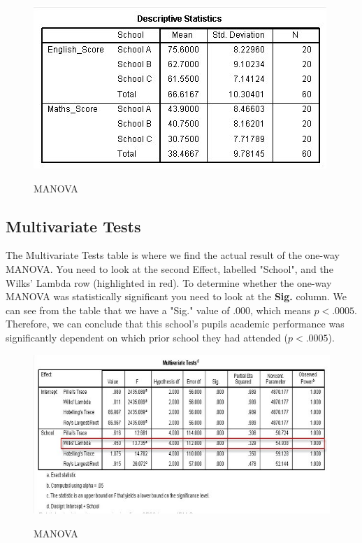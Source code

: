 \documentclass[12pt]{article} %
\begin{document}
\begin{center}
\begin{figure}[h!]
  \includegraphics[scale=0.6]{MANOVA8}\\
  \caption{MANOVA}
\end{figure}
\end{center}


\subsection{Multivariate Tests}
The Multivariate Tests table is where we find the actual result of the one-way MANOVA. You need to look at the second Effect, labelled "School", and the Wilks' Lambda row (highlighted in red). To determine whether the one-way MANOVA was statistically significant you need to look at the \textbf{Sig.} column. We can see from the table that we have a "Sig." value of .000, which means $p < .0005$. Therefore, we can conclude that this school's pupils academic performance was significantly dependent on which prior school they had attended ($p < .0005$).


\begin{center}
\begin{figure}[h!]
  \includegraphics[scale=0.6]{MANOVA7}\\
  \caption{MANOVA}
\end{figure}
\end{center}
\end{document}
